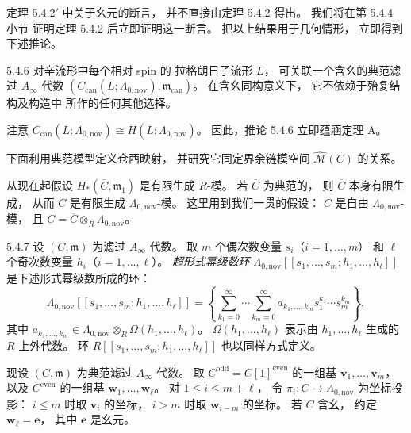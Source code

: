 定理 5.4.2$'$
中关于幺元的断言，
并不直接由定理 5.4.2 得出。
我们将在第 5.4.4 小节
证明定理 5.4.2 后立即证明这一断言。
把以上结果用于几何情形，
立即得到下述推论。

\begin{corollary}{5.4.6}\label{cor:5-4-6}
对辛流形中每个相对 spin 的
拉格朗日子流形 $L$，
可关联一个含幺的典范滤过
$A_\infty$ 代数
$(C_{\mathrm{can}}(L;\Lambda_{0,\mathrm{nov}}),
\mathfrak m_{\mathrm{can}})$。
在含幺同构意义下，
它不依赖于殆复结构及构造中
所作的任何其他选择。
\end{corollary}

注意
$C_{\mathrm{can}}(L;\Lambda_{0,\mathrm{nov}})
\cong H(L;\Lambda_{0,\mathrm{nov}})$。
因此，推论 5.4.6 立即蕴涵定理 A。

下面利用典范模型定义仓西映射，
并研究它同定界余链模空间
$\widehat{\mathcal M}(C)$ 的关系。

从现在起假设
$H_*(\overline C,\overline{\mathfrak m}_1)$
是有限生成 $R$-模。
若 $\overline C$ 为典范的，
则 $\overline C$ 本身有限生成，
从而 $C$ 是有限生成
$\Lambda_{0,\mathrm{nov}}$-模。
这里用到我们一贯的假设：
$C$ 是自由
$\Lambda_{0,\mathrm{nov}}$-模，
且
$C=\overline C\otimes_R
\Lambda_{0,\mathrm{nov}}$。

\begin{definition}{5.4.7}\label{def:5-4-7}
设 $(C,\mathfrak m)$ 为滤过
$A_\infty$ 代数。
取 $m$ 个偶次数变量
$s_i$（$i=1,\ldots,m$）
和 $\ell$ 个奇次数变量
$h_i$（$i=1,\ldots,\ell$）。
\emph{超形式幂级数环}
$\Lambda_{0,\mathrm{nov}}
[[s_1,\ldots,s_m;h_1,\ldots,h_\ell]]$
是下述形式幂级数所成的环：
\[
\Lambda_{0,\mathrm{nov}}
[[s_1,\ldots,s_m;h_1,\ldots,h_\ell]]
=
\left\{
\sum_{k_1=0}^{\infty}\cdots
\sum_{k_m=0}^{\infty}
a_{k_1,\ldots,k_m}
s_1^{k_1}\cdots s_m^{k_m}
\right\},
\]
其中
$a_{k_1,\ldots,k_m}
\in\Lambda_{0,\mathrm{nov}}
\otimes_R\Omega(h_1,\ldots,h_\ell)$。
$\Omega(h_1,\ldots,h_\ell)$
表示由 $h_1,\ldots,h_\ell$
生成的 $R$ 上外代数。
环 $R[[s_1,\ldots,s_m;
h_1,\ldots,h_\ell]]$
也以同样方式定义。
\end{definition}

现设 $(C,\mathfrak m)$
为典范滤过 $A_\infty$ 代数。
取 $C^{\mathrm{odd}}
=C[1]^{\mathrm{even}}$
的一组基
$\mathbf v_1,\ldots,\mathbf v_m$，
以及 $C^{\mathrm{even}}$
的一组基
$\mathbf w_1,\ldots,\mathbf w_\ell$。
对 $1\le i\le m+\ell$，
令
$\pi_i\colon C\to\Lambda_{0,\mathrm{nov}}$
为坐标投影：
$i\le m$ 时取
$\mathbf v_i$ 的坐标，
$i>m$ 时取
$\mathbf w_{i-m}$ 的坐标。
若 $C$ 含幺，
约定 $\mathbf w_\ell=\mathbf e$，
其中 $\mathbf e$ 是幺元。

